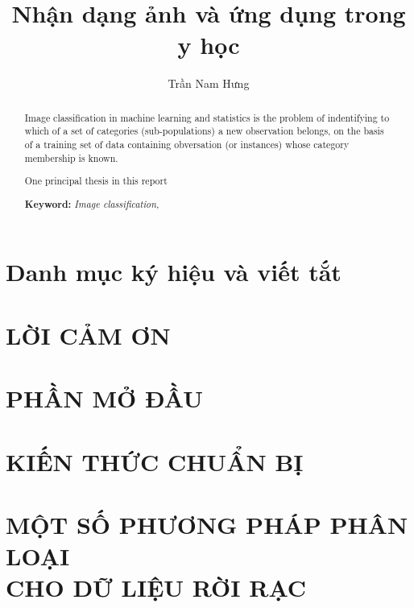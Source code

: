 \documentclass[a4paper,oneside]{report}			%
\title{Nhận dạng ảnh và ứng dụng trong y học}
\author{Trần Nam Hưng}
\theoremstyle{plain}
\theoremstyle{plain}
\theoremstyle{nonumberplain}
\begin{document}



\begin{abstract}
	Image classification in machine learning and statistics is the problem of indentifying to which of a set of categories (sub-populations) a new observation belongs, on the basis of a training set of data containing obversation (or instances) whose category membership is known.
	
	One principal thesis in this report 

	\textbf{Keyword:} \textit{Image classification,}
\end{abstract}


\tableofcontents			%
\listoffigures				%
\listoftables				%
\listofalgorithms


\chapter*{Danh mục ký hiệu và viết tắt}

\clearpage

\chapter*{LỜI CẢM ƠN}




\chapter*{PHẦN MỞ ĐẦU}


	
\chapter{KIẾN THỨC CHUẨN BỊ}
\setcounter{page}{1}	%

	

\chapter[MỘT SỐ PHƯƠNG PHÁP PHÂN LOẠI CHO DỮ LIỆU RỜI RẠC]{MỘT SỐ PHƯƠNG PHÁP PHÂN LOẠI\\ CHO DỮ LIỆU RỜI RẠC}
	
\end{document}
